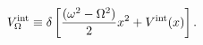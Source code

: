 \begin{equation}
V_{\Omega}^{\rm int}\equiv \delta \left[
\frac{( \omega ^2- \Omega ^2)}{2}x^2+V^{\rm int}(x)\right] .
\label{@varint}\end{equation}

